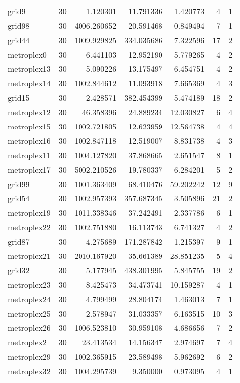 \begin{longtable}{|l|r|r|r|r|r|r|}
grid9 & 30 & 1.120301 & 11.791336 & 1.420773 & 4 & 1 \\
grid98 & 30 & 4006.260652 & 20.591468 & 0.849494 & 7 & 1 \\
grid44 & 30 & 1009.929825 & 334.035686 & 7.322596 & 17 & 2 \\
metroplex0 & 30 & 6.441103 & 12.952190 & 5.779265 & 4 & 2 \\
metroplex13 & 30 & 5.090226 & 13.175497 & 6.454751 & 4 & 2 \\
metroplex14 & 30 & 1002.844612 & 11.093918 & 7.665369 & 4 & 3 \\
grid15 & 30 & 2.428571 & 382.454399 & 5.474189 & 18 & 2 \\
metroplex12 & 30 & 46.358396 & 24.889234 & 12.030827 & 6 & 4 \\
metroplex15 & 30 & 1002.721805 & 12.623959 & 12.564738 & 4 & 4 \\
metroplex16 & 30 & 1002.847118 & 12.519007 & 8.831738 & 4 & 3 \\
metroplex11 & 30 & 1004.127820 & 37.868665 & 2.651547 & 8 & 1 \\
metroplex17 & 30 & 5002.210526 & 19.780337 & 6.284201 & 5 & 2 \\
grid99 & 30 & 1001.363409 & 68.410476 & 59.202242 & 12 & 9 \\
grid54 & 30 & 1002.957393 & 357.687345 & 3.505896 & 21 & 2 \\
metroplex19 & 30 & 1011.338346 & 37.242491 & 2.337786 & 6 & 1 \\
metroplex22 & 30 & 1002.751880 & 16.113743 & 6.741327 & 4 & 2 \\
grid87 & 30 & 4.275689 & 171.287842 & 1.215397 & 9 & 1 \\
metroplex21 & 30 & 2010.167920 & 35.661389 & 28.851235 & 5 & 4 \\
grid32 & 30 & 5.177945 & 438.301995 & 5.845755 & 19 & 2 \\
metroplex23 & 30 & 8.425473 & 34.473741 & 10.159287 & 4 & 1 \\
metroplex24 & 30 & 4.799499 & 28.804174 & 1.463013 & 7 & 1 \\
metroplex25 & 30 & 2.578947 & 31.033357 & 6.163515 & 10 & 3 \\
metroplex26 & 30 & 1006.523810 & 30.959108 & 4.686656 & 7 & 2 \\
metroplex2 & 30 & 23.413534 & 14.156347 & 2.974697 & 7 & 4 \\
metroplex29 & 30 & 1002.365915 & 23.589498 & 5.962692 & 6 & 2 \\
metroplex32 & 30 & 1004.295739 & 9.350000 & 0.973095 & 4 & 1 \\

\end{longtable}
